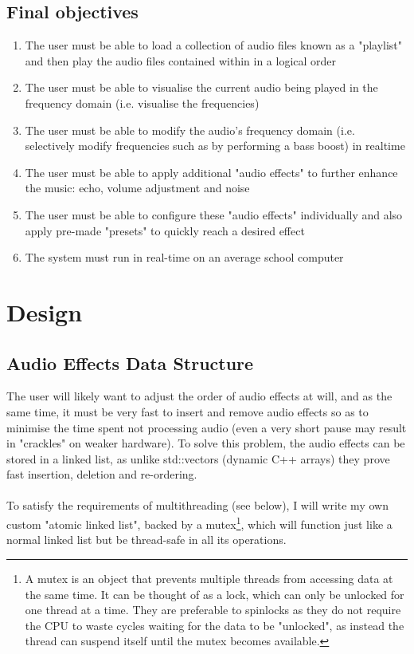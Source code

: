\documentclass{article}
\begin{document}
	\subsection{Final objectives}
	\begin{enumerate}
	\item  The user must be able to load a collection of audio files known as a "playlist" and then play the audio files contained within in a logical order
	\item  The user must be able to visualise the current audio being played in the frequency domain (i.e. visualise the frequencies)
	\item The user must be able to modify the audio's frequency domain (i.e. selectively modify frequencies such as by performing a bass boost) in realtime
	\item The user must be able to apply additional "audio effects" to further enhance the music: echo, volume adjustment and noise
	\item The user must be able to configure these "audio effects" individually and also apply pre-made "presets" to quickly reach a desired effect
	\item  The system must run in real-time on an average school computer
	\end{enumerate}


	\section { Design }
	
	\subsection{Audio Effects Data Structure}
	The user will likely want to adjust the order of audio effects at will, and as the same time, it must be very fast to insert and  remove audio effects so as to minimise the time spent not processing audio (even a very short pause may result in "crackles" on weaker hardware). To solve this problem, the audio effects can be stored in a linked list, as unlike std::vectors (dynamic C++ arrays) they prove fast insertion, deletion and re-ordering.
	
	\paragraph{}
	To satisfy the requirements of multithreading (see below), I will write my own custom "atomic linked list", backed by a mutex\footnote{
		A mutex is an object that prevents multiple threads from accessing data at the same time. It can be thought of as a lock, which can only be unlocked for one thread at a time. They are preferable to spinlocks as they do not require the CPU to waste cycles waiting for the data to be "unlocked", as instead the thread can suspend itself until the mutex becomes available.
	}, which will function just like a normal linked list but be thread-safe in all its operations.
	
\end{document}

